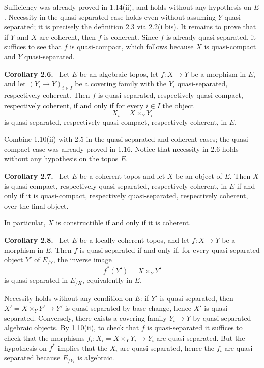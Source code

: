 \documentclass[11pt]{article}
\newenvironment{statement}[1]{\par\medskip\noindent\textbf{#1.}\ }{\par\medskip}
\begin{document}
Sufficiency was already proved in 1.14(ii), and holds without any hypothesis on \(E\). Necessity in the quasi-separated case holds even without assuming \(Y\) quasi-separated; it is precisely the definition 2.3 via 2.2(i bis). It remains to prove that if \(Y\) and \(X\) are coherent, then \(f\) is coherent. Since \(f\) is already quasi-separated, it suffices to see that \(f\) is quasi-compact, which follows because \(X\) is quasi-compact and \(Y\) quasi-separated.

\begin{statement}{Corollary 2.6}
Let \(E\) be an algebraic topos, let \(f:X\to Y\) be a morphism in \(E\), and let \((Y_i\to Y)_{i\in I}\) be a covering family with the \(Y_i\) quasi-separated, respectively coherent. Then \(f\) is quasi-separated, respectively quasi-compact, respectively coherent, if and only if for every \(i\in I\) the object
\[
X_i=X\times_Y Y_i
\]
is quasi-separated, respectively quasi-compact, respectively coherent, in \(E\).
\end{statement}

Combine 1.10(ii) with 2.5 in the quasi-separated and coherent cases; the quasi-compact case was already proved in 1.16. Notice that necessity in 2.6 holds without any hypothesis on the topos \(E\).

\begin{statement}{Corollary 2.7}
Let \(E\) be a coherent topos and let \(X\) be an object of \(E\). Then \(X\) is quasi-compact, respectively quasi-separated, respectively coherent, in \(E\) if and only if it is quasi-compact, respectively quasi-separated, respectively coherent, over the final object.
\end{statement}

In particular, \(X\) is constructible if and only if it is coherent.

\begin{statement}{Corollary 2.8}
Let \(E\) be a locally coherent topos, and let \(f:X\to Y\) be a morphism in \(E\). Then \(f\) is quasi-separated if and only if, for every quasi-separated object \(Y'\) of \(E_{/Y}\), the inverse image
\[
f^*(Y')=X\times_YY'
\]
is quasi-separated in \(E_{/X}\), equivalently in \(E\).
\end{statement}

Necessity holds without any condition on \(E\): if \(Y'\) is quasi-separated, then \(X'=X\times_YY'\to Y'\) is quasi-separated by base change, hence \(X'\) is quasi-separated. Conversely, there exists a covering family \(Y_i\to Y\) by quasi-separated algebraic objects. By 1.10(ii), to check that \(f\) is quasi-separated it suffices to check that the morphisms \(f_i:X_i=X\times_YY_i\to Y_i\) are quasi-separated. But the hypothesis on \(f^*\) implies that the \(X_i\) are quasi-separated, hence the \(f_i\) are quasi-separated because \(E_{/Y_i}\) is algebraic.
\end{document}
